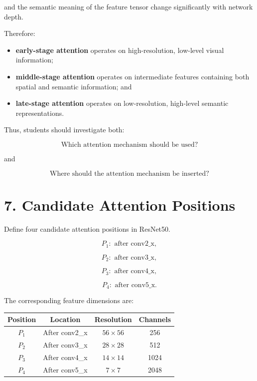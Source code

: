 \documentclass[10pt]{article}
\begin{document}
and the semantic meaning of the feature tensor change significantly with
network depth.

Therefore:

\begin{itemize}

\item \textbf{early-stage attention} operates on high-resolution,
low-level visual information;

\item \textbf{middle-stage attention} operates on intermediate features
containing both spatial and semantic information; and

\item \textbf{late-stage attention} operates on low-resolution,
high-level semantic representations.

\end{itemize}

Thus, students should investigate both:

\[
\boxed{\text{Which attention mechanism should be used?}}
\]

and

\[
\boxed{\text{Where should the attention mechanism be inserted?}}
\]

\section*{7. Candidate Attention Positions}

Define four candidate attention positions in ResNet50.

\[
P_1:
\text{ after conv2\_x},
\]

\[
P_2:
\text{ after conv3\_x},
\]

\[
P_3:
\text{ after conv4\_x},
\]

\[
P_4:
\text{ after conv5\_x}.
\]

The corresponding feature dimensions are:

\begin{center}

\begin{tabular}{|c|c|c|c|}
\hline

\textbf{Position}
&
\textbf{Location}
&
\textbf{Resolution}
&
\textbf{Channels}
\\
\hline

$P_1$
&
After conv2\_x
&
$56\times56$
&
256
\\
\hline

$P_2$
&
After conv3\_x
&
$28\times28$
&
512
\\
\hline

$P_3$
&
After conv4\_x
&
$14\times14$
&
1024
\\
\hline

$P_4$
&
After conv5\_x
&
$7\times7$
&
2048
\\
\hline

\end{tabular}

\end{center}
\end{document}
